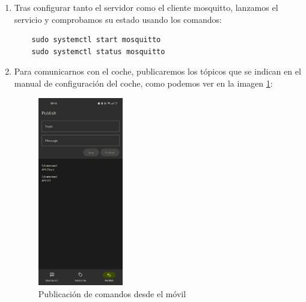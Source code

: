 \begin{enumerate}
\item Tras configurar tanto el servidor como el cliente mosquitto, lanzamos el servicio y comprobamos su estado usando los comandos:
\begin{lstlisting}
	sudo systemctl start mosquitto
	sudo systemctl status mosquitto
\end{lstlisting}


\item Para comunicarnos con el coche, publicaremos los tópicos que se indican en el manual de configuración del coche, como podemos ver en la imagen \ref{mosquitto2}:

 \begin{figure}[H]
    \centering
    \includegraphics[width=0.35\textwidth]{Imagenes/Rendimiento/mosquitto2.jpeg}
    \caption{Publicación de comandos desde el móvil}
    \label{mosquitto2}
\end{figure}

\end{enumerate}
